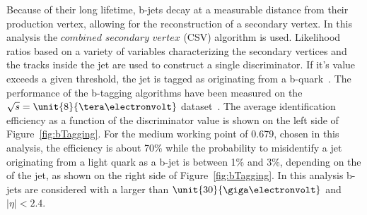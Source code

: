 Because of their long lifetime, b-jets decay at a measurable distance from their production vertex, allowing for the reconstruction of a secondary vertex. In this analysis the $\textit{combined}$ $\textit{secondary}$ $\textit{vertex}$ (CSV) algorithm is used. Likelihood ratios based on a variety of variables characterizing the secondary vertices and the tracks inside the jet are used to construct a single discriminator. If it's value exceeds a given threshold, the jet is tagged as originating from a b-quark~\cite{Chatrchyan:2012jua}. The performance of the b-tagging algorithms have been measured on the $\sqrt{s} = \unit{8}{\tera\electronvolt}$ dataset~\cite{CMS-DP-2013-005}. The average identification efficiency as a function of the discriminator value is shown on the left side of Figure~\ref{fig:bTagging}. For the medium working point of 0.679, chosen in this analysis, the efficiency is about 70\% while the probability to misidentify a jet originating from a light quark as a b-jet is between 1\% and 3\%, depending on the \pt of the jet, as shown on the right side of Figure~\ref{fig:bTagging}. In this analysis b-jets are considered with a \pt larger than $\unit{30}{\giga\electronvolt}$ and $|\eta| < 2.4$. 

